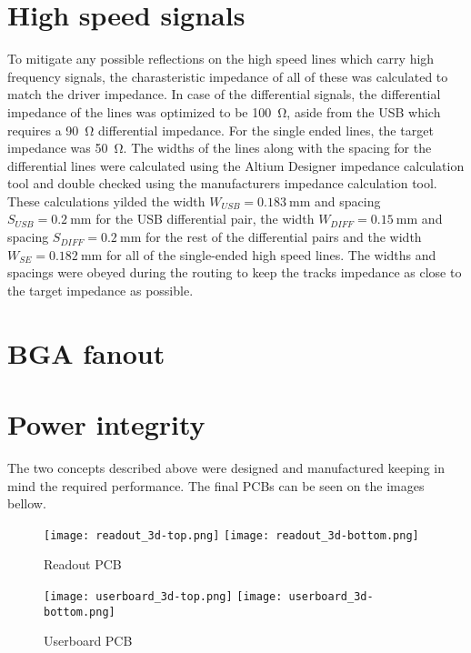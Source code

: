 \section{High speed signals}
To mitigate any possible reflections on the high speed lines which carry high frequency signals, the charasteristic impedance of all of these was calculated to match the driver impedance. In case of the differential signals, the differential impedance of the lines was optimized to be \SI{100}{\ohm}, aside from the USB which requires a \SI{90}{\ohm} differential impedance. For the single ended lines, the target impedance was \SI{50}{\ohm}. The widths of the lines along with the spacing for the differential lines were calculated using the Altium Designer impedance calculation tool and double checked using the manufacturers impedance calculation tool. These calculations yilded the width $W_{USB} = \SI{0.183}{\milli\meter}$ and spacing $S_{USB} = \SI{0.2}{\milli\meter}$ for the USB differential pair, the width $W_{DIFF} = \SI{0.15}{\milli\meter}$ and spacing $S_{DIFF} = \SI{0.2}{\milli\meter}$ for the rest of the differential pairs and the width $W_{SE} = \SI{0.182}{\milli\meter}$ for all of the single-ended high speed lines. The widths and spacings were obeyed during the routing to keep the tracks impedance as close to the target impedance as possible.

\section{BGA fanout}


\section{Power integrity}

The two concepts described above were designed and manufactured keeping in mind the required performance. The final PCBs can be seen on the images bellow. 
\newpage
\FloatBarrier
\begin{figure}[htp!]
    \centering
    \texttt{[image: readout\_3d-top.png]}
    \texttt{[image: readout\_3d-bottom.png]}
    \caption{Readout PCB}
    \label{fig:readout_3d}
\end{figure}
\FloatBarrier

\FloatBarrier
\begin{figure}[htp!]
    \centering
    \texttt{[image: userboard\_3d-top.png]}
    \hspace{1.8cm}
    \texttt{[image: userboard\_3d-bottom.png]}
    \caption{Userboard PCB}
    \label{fig:userboard_3d}
\end{figure}
\FloatBarrier